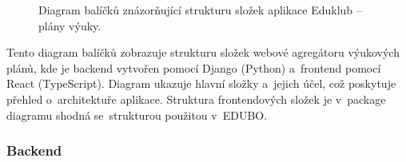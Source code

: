 \documentclass[male,czech,api_bc]{kitheses}
\begin{document}
\begin{figure}[H]
	\centering
	\caption{Diagram balíčků znázorňující strukturu složek aplikace Eduklub – plány výuky.}
	\label{fig:package-diagram-2}
\end{figure}

Tento diagram balíčků zobrazuje strukturu složek webové agregátoru výukových plánů, kde je backend vytvořen pomocí Django (Python) a~frontend pomocí React (TypeScript). Diagram ukazuje hlavní složky a~jejich účel, což poskytuje přehled o~architektuře aplikace. Struktura frontendových složek je v~package diagramu shodná se~strukturou použitou v~EDUBO.

\subsubsection{Backend}
\end{document}
